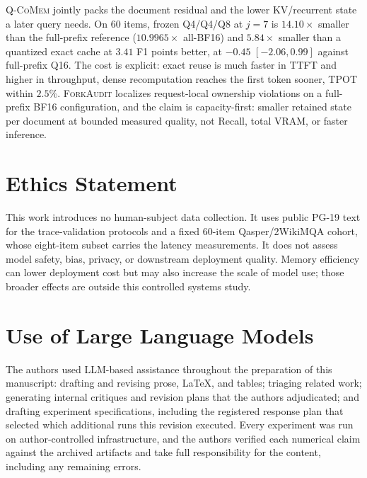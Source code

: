 \documentclass{article}
\newcommand{\qcomem}{\textsc{Q-CoMem}}
\newcommand{\method}{\textsc{ForkAudit}}
\begin{document}
\qcomem{} jointly packs the document residual and the lower KV/recurrent state a
later query needs.  On 60 items, frozen Q4/Q4/Q8 at $j=7$ is $14.10\times$
smaller than the full-prefix reference ($10.9965\times$ all-BF16) and
$5.84\times$ smaller than a quantized exact cache at $3.41$ F1 points better, at
$-0.45$ $[-2.06,0.99]$ against full-prefix Q16.  The cost is explicit: exact reuse is
much faster in TTFT and higher in throughput, dense recomputation reaches the
first token sooner, TPOT within $2.5\%$.  \method{} localizes request-local
ownership violations on a full-prefix BF16 configuration, and the claim is
capacity-first: smaller retained state per document at bounded measured quality,
not Recall, total VRAM, or faster inference.

\section*{Ethics Statement}
This work introduces no human-subject data collection. It uses public PG-19
text for the trace-validation protocols and a fixed 60-item Qasper/2WikiMQA
cohort, whose eight-item subset carries the latency measurements. It does not
assess model safety, bias, privacy, or downstream deployment quality. Memory
efficiency can lower deployment cost but may also increase the scale of model
use; those broader effects are outside this controlled systems study.

\section*{Use of Large Language Models}
The authors used LLM-based assistance throughout the preparation of this
manuscript: drafting and revising prose, LaTeX, and tables; triaging related
work; generating internal critiques and revision plans that the authors
adjudicated; and drafting experiment specifications, including the registered
response plan that selected which additional runs this revision executed. Every
experiment was run on author-controlled infrastructure, and the authors verified
each numerical claim against the archived artifacts and take full responsibility
for the content, including any remaining errors.
\end{document}
